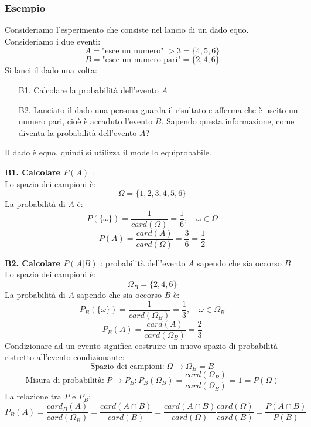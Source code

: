\documentclass[a4paper]{article}
\theoremstyle{break}
\theoremstyle{break}
\theoremstyle{break}
\theoremstyle{break}
\begin{document}
\subsubsection{Esempio}
\begin{example}
	Consideriamo l'esperimento che consiste nel lancio di un dado equo. Consideriamo i due
	eventi:
	\[
		A = \text{"esce un numero"}\;>3 = \{4,5,6\}
	\]
	\[
		B = \text{"esce un numero pari"} = \{2,4,6\}
	\]
	Si lanci il dado una volta:
	\begin{enumerate}
		\item[B1.] Calcolare la probabilità dell'evento \( A \)
		\item[B2.] Lanciato il dado una persona guarda il risultato e afferma che è uscito un
		      numero pari, cioè è accaduto l'evento \( B \). Sapendo questa informazione, come
		      diventa la probabilità dell'evento \( A \)?
	\end{enumerate}
	Il dado è equo, quindi si utilizza il modello equiprobabile.

	\vspace{1em}
	\noindent \textbf{B1. Calcolare \( P(A) \) }:\\
	Lo spazio dei campioni è:
	\[
		\Omega = \{1,2,3,4,5,6\}
	\]
	La probabilità di \( A \) è:
	\[
		P(\{\omega\} ) = \frac{1}{card(\Omega)} = \frac{1}{6}, \quad \omega \in \Omega
	\]
	\[
		P(A) = \frac{card(A)}{card(\Omega)} = \frac{3}{6} = \frac{1}{2}
	\]

	\vspace{1em}
	\noindent \textbf{B2. Calcolare \( P(A|B) \) }: probabilità dell'evento \( A \) sapendo che sia
	occorso \( B \) \\
	Lo spazio dei campioni è:
	\[
		\Omega_B = \{2,4,6\}
	\]
	La probabilità di \( A \) sapendo che sia occorso \( B \) è:
	\[
		P_B(\{\omega\} ) = \frac{1}{card(\Omega_B)} = \frac{1}{3}, \quad \omega \in \Omega_B
	\]
	\[
		P_B(A) = \frac{card(A)}{card(\Omega_B)} = \frac{2}{3}
	\]
	Condizionare ad un evento significa costruire un nuovo spazio di probabilità ristretto
	all'evento condizionante:
	\[
		\text{Spazio dei campioni:}\; \Omega \to \Omega_B = B
	\]
	\[
		\text{Misura di probabilità:}\; P \to P_B:P_B(\Omega_B) = \frac{card(\Omega_B)}{card(\Omega_B)}
		= 1 = P(\Omega)
	\]
	La relazione tra \( P \) e \( P_B \):
	\[
		P_B(A) = \frac{card_B(A)}{card(\Omega_B)} = \frac{card(A \cap B)}{card(B)}
		= \frac{card(A \cap B)}{card(\Omega)}\frac{card(\Omega)}{card(B)} =\frac{P(A \cap B)}{P(B)}
	\]
\end{example}
\end{document}
